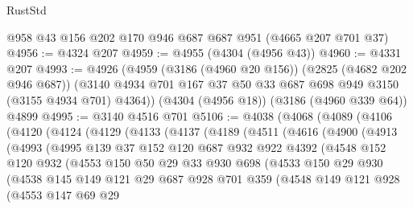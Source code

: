 \begin{lexlean}{RustStd}
\begin{coremodule}
    @958
    @43
    @156
    @202
    @170
    @946
    @687
    @687
    @951
    (@4665 @207 @701 @37)
@4956 := @4324 @207
@4959 := @4955 (@4304 (@4956 @43))
@4960 := @4331 @207
@4993 := @4926
    (@4959
      (@3186 (@4960 @20 @156))
      (@2825 (@4682 @202 @946 @687))
      (@3140 @4934 @701 @167 @37 @50 @33 @687 @698 @949 @3150 (@3155 @4934 @701) @4364))
    (@4304 (@4956 @18))
    (@3186 (@4960 @339 @64))
    @4899
@4995 := @3140 @4516 @701
@5106 := @4038
    (@4068
      (@4089
        (@4106
          (@4120
            (@4124
              (@4129
                (@4133
                  (@4137
                    (@4189
                      (@4511
                        (@4616
                          (@4900
                            (@4913
                              (@4993
                                (@4995
                                  @139
                                  @37
                                  @152
                                  @120
                                  @687
                                  @932
                                  @922
                                  @4392
                                  (@4548
                                    @152
                                    @120
                                    @932
                                    (@4553
                                      @150
                                      @50
                                      @29
                                      @33
                                      @930
                                      @698
                                      (@4533
                                        @150
                                        @29
                                        @930
                                        (@4538
                                          @145
                                          @149
                                          @121
                                          @29
                                          @687
                                          @928
                                          @701
                                          @359
                                          (@4548
                                            @149
                                            @121
                                            @928
                                            (@4553
                                              @147
                                              @69
                                              @29

\end{coremodule}
\end{lexlean}
